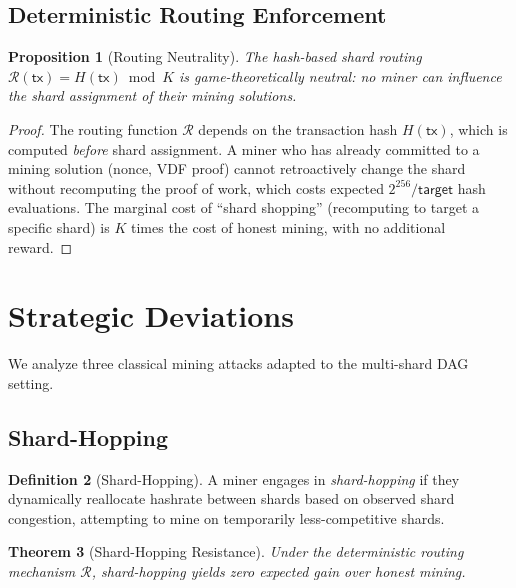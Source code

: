 \documentclass[11pt,a4paper]{article}
\newtheorem{theorem}{Theorem}[section]
\newtheorem{proposition}[theorem]{Proposition}
\theoremstyle{definition}
\newtheorem{definition}[theorem]{Definition}
\theoremstyle{remark}
\begin{document}
\subsection{Deterministic Routing Enforcement}

\begin{proposition}[Routing Neutrality]\label{prop:routing-neutral}
The hash-based shard routing $\mathcal{R}(\mathsf{tx}) = H(\mathsf{tx}) \bmod K$
is game-theoretically neutral: no miner can influence the shard assignment
of their mining solutions.
\end{proposition}

\begin{proof}
The routing function $\mathcal{R}$ depends on the transaction hash
$H(\mathsf{tx})$, which is computed \emph{before} shard assignment.
A miner who has already committed to a mining solution (nonce, VDF proof)
cannot retroactively change the shard without recomputing the proof of work,
which costs expected $2^{256}/\mathsf{target}$ hash evaluations.
The marginal cost of ``shard shopping'' (recomputing to target a specific
shard) is $K$ times the cost of honest mining, with no additional reward.
\end{proof}

\section{Strategic Deviations}\label{sec:strategies}

We analyze three classical mining attacks adapted to the multi-shard
DAG setting.

\subsection{Shard-Hopping}

\begin{definition}[Shard-Hopping]\label{def:shard-hop}
A miner engages in \emph{shard-hopping} if they dynamically reallocate
hashrate between shards based on observed shard congestion, attempting
to mine on temporarily less-competitive shards.
\end{definition}

\begin{theorem}[Shard-Hopping Resistance]\label{thm:shard-hop}
Under the deterministic routing mechanism $\mathcal{R}$, shard-hopping
yields zero expected gain over honest mining.
\end{theorem}
\end{document}
